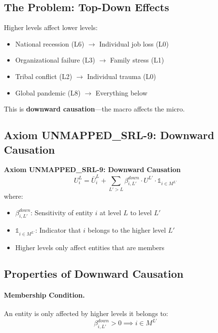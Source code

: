 \subsection{The Problem: Top-Down Effects}

Higher levels affect lower levels:
\begin{itemize}
\item National recession (L6) $\to$ Individual job loss (L0)
\item Organizational failure (L3) $\to$ Family stress (L1)
\item Tribal conflict (L2) $\to$ Individual trauma (L0)
\item Global pandemic (L8) $\to$ Everything below
\end{itemize}

This is \textbf{downward causation}---the macro affects the micro.

\subsection{Axiom UNMAPPED_SRL-9: Downward Causation}

\begin{tcolorbox}[colback=gray!5!white, colframe=gray!75!black]
\textbf{Axiom UNMAPPED_SRL-9: Downward Causation}
\begin{equation}
\boxed{
U^L_i = \bar{U}^L_i + \sum_{L' > L} \beta^{down}_{i,L'} \cdot U^{L'} \cdot \mathbb{1}_{i \in M^{L'}}
}
\end{equation}
where:
\begin{itemize}
\item $\beta^{down}_{i,L'}$: Sensitivity of entity $i$ at level $L$ to level $L'$
\item $\mathbb{1}_{i \in M^{L'}}$: Indicator that $i$ belongs to the higher level $L'$
\item Higher levels only affect entities that are members
\end{itemize}
\end{tcolorbox}

\subsection{Properties of Downward Causation}

\paragraph{Membership Condition.}
An entity is only affected by higher levels it belongs to:
\begin{equation}
\beta^{down}_{i,L'} > 0 \implies i \in M^{L'}
\end{equation}

